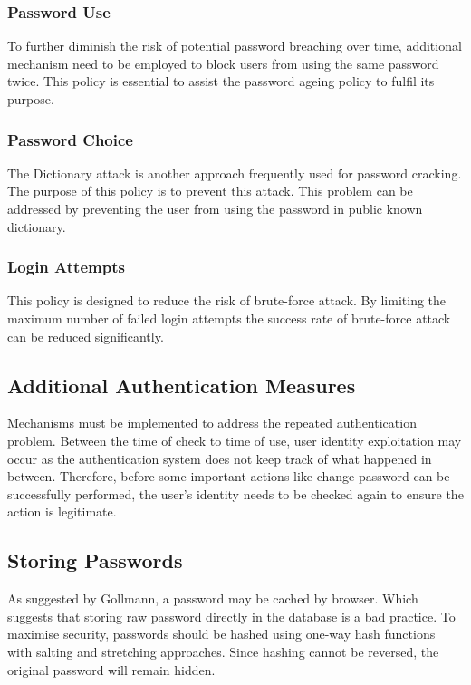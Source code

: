 \documentclass{article}
\begin{document}
\subsubsection{Password Use}
To further diminish the risk of potential password breaching over time, additional mechanism 
need to be employed to block users from using the same password twice. This policy is essential 
to assist the password ageing policy to fulfil its purpose.

\subsubsection{Password Choice}
The Dictionary attack is another approach frequently used for password cracking. The purpose of 
this policy is to prevent this attack. This problem can be addressed by preventing the user from 
using the password in public known dictionary.

\subsubsection{Login Attempts}
This policy is designed to reduce the risk of brute-force attack. By limiting the maximum number of 
failed login attempts the success rate of brute-force attack can be reduced significantly.

\subsection{Additional Authentication Measures}
Mechanisms must be implemented to address the repeated authentication problem. 
Between the time of check to time of use, user identity exploitation may occur as the 
authentication system does not keep track of what happened in between. 
Therefore, before some important actions like change password can be successfully performed, 
the user's identity needs to be checked again to ensure the action is legitimate.

\subsection{Storing Passwords}
As suggested by Gollmann, a password may be cached by browser\cite{GollmannDieter2011Cs/D}. Which 
suggests that storing raw password directly in the database is a bad practice. To maximise security, 
passwords should be hashed using one-way hash functions with salting and stretching approaches\cite{FergusonNiels2010Ce:d}.
Since hashing cannot be reversed, the original password will remain hidden.
\end{document}

